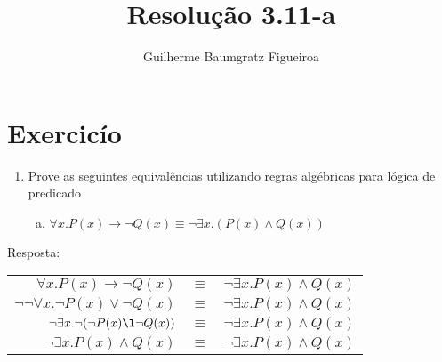 \documentclass[aspectratio=43]{beamer}
\title[\sc{Resolu\c c\~ao}]{Resolu\c c\~ao 3.11-a}
\author[Guilherme Baumgratz Figueiroa]{Guilherme Baumgratz Figueiroa}
\institute[UFOP]{Universidade Federal de Ouro Preto} %
\date{}
\begin{document}
	
\begin{frame}
	\titlepage
\end{frame}

\section{Exercic\'io}

\begin{frame}%
	\begin{enumerate}[1.]
		\item Prove as seguintes equival\^encias utilizando regras alg\'ebricas para l\'ogica de predicado

	\begin{enumerate}[a)]
		
		\item $\forall x.P(x)\to\neg Q(x) \equiv \neg\exists x.(P(x)\land Q(x))$ \\
		
	\end{enumerate}
	
	\end{enumerate}
	Resposta:
	\\
	\centering
	\pause
	
	\begin{tabular}{rcl}
		$\forall x. P(x)\to\neg Q(x)$ & $\equiv$ & $\neg\exists x.P(x)\land Q(x)$\\
		\pause
		$\neg \neg \forall x.\neg P(x)\lor\neg Q(x)$  & $\equiv$ & $\neg\exists x.P(x)\land Q(x)$ \\
		\pause
		$\neg\exists x.\neg (\neg P(x)\l\neg Q(x))$  & $\equiv$ & $\neg\exists x.P(x)\land Q(x)$ \\
		\pause
		$\neg\exists x. P(x) \land Q(x)$  & $\equiv$ & $\neg\exists x.P(x)\land Q(x)$ 
	\end{tabular}
	
	
\end{frame}
\end{document}
